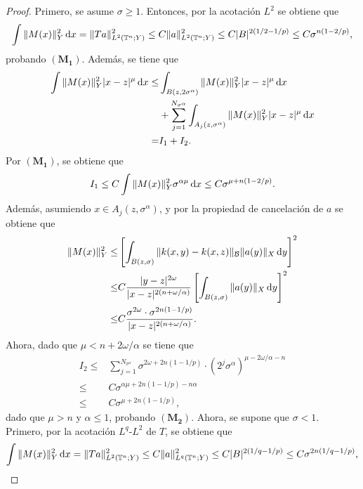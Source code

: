 \begin{proof}
	Primero, se asume $\sigma \geq 1$. Entonces, por la acotación $L^2$ se obtiene que
	\begin{equation*}
		\int\|M(x)\|_Y^2\mathop{}\!\mathrm{d} x = \|Ta\|_{L^2(\mathbb{T}^n;Y)}^2 \leq C \|a\|_{L^2(\mathbb{T}^n;Y)}^2 \leq C |B|^{2(1/2-1/p)} \leq C\sigma^{n(1-2/p)},
	\end{equation*}
	probando $(\mathbf{M_1})$. Además, se tiene que 
	\begin{align*}
		\int \|M(x)\|_Y^2|x-z|^\mu \mathop{}\!\mathrm{d} x \leq &
		\int_{B(z, 2\sigma^\alpha)} \|M(x)\|_Y^2|x-z|^\mu \mathop{}\!\mathrm{d} x\\
		& + \sum_{j=1}^{N_{\sigma^\alpha}} \int_{A_j(z, \sigma^\alpha)} \|M(x)\|_Y^2|x-z|^\mu \mathop{}\!\mathrm{d} x \\
		= & I_1 + I_2.
	\end{align*}
	Por $(\mathbf{M_1})$, se obtiene que
	\begin{equation*}
		I_1 \leq C\int\|M(x)\|_Y^2 \sigma^{\alpha\mu} \mathop{}\!\mathrm{d} x\leq  C \sigma^{\mu +n(1-2/p)}.
	\end{equation*}
	Además, asumiendo $x\in A_j(z, \sigma^\alpha)$, y por la propiedad de cancelación de $a$ se obtiene que
	\begin{align*}
		\|M(x)\|_Y^2 \leq & \left[ \int_{B(z, \sigma)} \|k(x, y) - k(x,z)\|_\mathcal{B} \|a(y)\|_X \mathop{}\!\mathrm{d} y \right]^2 \\
		\leq & C\frac{|y-z|^{2\omega}}{|x-z|^{2(n+\omega/\alpha)}} 
		\left[ \int_{B(z, \sigma)} \|a(y)\|_X \mathop{}\!\mathrm{d} y \right]^2 \\
		\leq & C \frac{\sigma^{2\omega} \cdot \sigma^{2n(1-1/p)}}{|x-z|^{2(n+\omega/\alpha)}}.
	\end{align*}
	Ahora, dado que $\mu < n + 2\omega/\alpha$ se tiene que
	\begin{align*}
		I_2 \leq & \sum_{j=1}^{N_{\sigma^\alpha}} \sigma^{2\omega + 2n(1-1/p)} \cdot (2^j\sigma^\alpha)^{\mu - 2\omega/\alpha - n} \\
		\leq &  C \sigma^{\alpha\mu + 2n(1-1/p) - n\alpha} \\ 
		\leq & C \sigma^{\mu + 2n(1-1/p)},
	\end{align*}
	dado que $\mu > n$ y $\alpha \leq 1$, probando $(\mathbf{M_2})$. Ahora, se supone que $\sigma < 1$. Primero, por la acotación $L^q$-$L^2$ de $T$, se obtiene que 
	\begin{equation*}
		\int\|M(x)\|_Y^2\mathop{}\!\mathrm{d} x = \|Ta\|_{L^2(\mathbb{T}^n;Y)}^2 \leq C \|a\|_{L^q(\mathbb{T}^n;Y)}^2 \leq C |B|^{2(1/q-1/p)} \leq C\sigma^{2n(1/q-1/p)},
	\end{equation*}

\end{proof}
